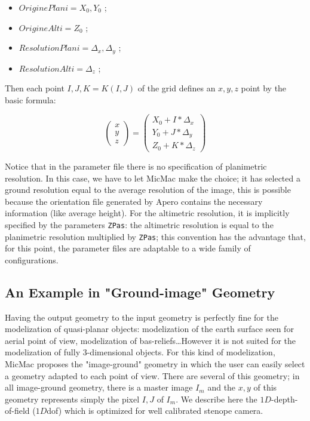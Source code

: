 \begin{itemize}
   \item  $OriginePlani=X_0,Y_0$  ;
   \item  $OrigineAlti=Z_0$       ;

   \item  $ResolutionPlani=\Delta_x,\Delta_y$       ;
   \item  $ResolutionAlti=\Delta_z$       ;
\end{itemize}

Then each point $I,J,K=K(I,J)$ of the grid defines an $x,y,z$ point by the basic formula:


\begin{equation}
   \begin{pmatrix}  x \\ y \\ z \end{pmatrix}
   = \begin{pmatrix}  X_0 + I * \Delta_x \\ Y_0 + J * \Delta_y \\ Z_0 + K * \Delta_z \end{pmatrix}
\end{equation}

Notice that in the parameter file there is no specification of planimetric resolution.
In this case, we have to let MicMac make the choice; it has selected a ground resolution
equal to the average resolution of the image, this is possible because the orientation
file generated by Apero contains the necessary information (like average height).
For the altimetric resolution, it is implicitly specified by the parameters
{\tt ZPas}: the altimetric resolution is equal to the  planimetric resolution
multiplied by {\tt ZPas}; this convention has the advantage that, for this point, the parameter
files are adaptable to a wide family of configurations.


\subsection{An Example in "Ground-image" Geometry}

\label{EX:TER:IM:GEOM}

Having the output geometry  to the input geometry is perfectly fine for the
modelization of quasi-planar objects: modelization of the earth surface seen for aerial
point of view, modelization of bas-reliefs\dots However it is not suited for the
modelization of fully 3-dimensional objects.  For this kind of modelization, MicMac
proposes the "image-ground" geometry in which the user can easily select a geometry
adapted to each point of view. There are several  of this geometry;
in all image-ground geometry, there is a master image $I_m$ and the $x,y$
of this geometry represents simply the pixel $I,J$ of $I_m$.
We describe here the $1D$-depth-of-field ($1D$dof)  which is optimized for well calibrated stenope camera.

